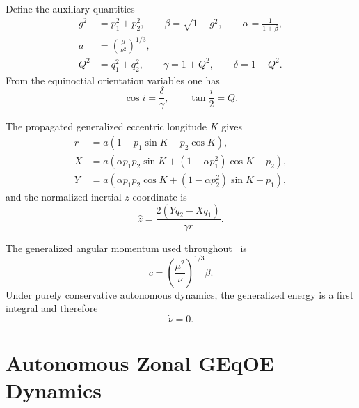 \documentclass[11pt]{article}
\begin{document}
Define the auxiliary quantities
\begin{align}
g^2 &= p_1^2 + p_2^2, \qquad \beta = \sqrt{1-g^2}, \qquad
\alpha = \frac{1}{1+\beta}, \label{eq:prelim_beta}\\
a &= \left(\frac{\mu}{\nu^2}\right)^{1/3}, \\
Q^2 &= q_1^2 + q_2^2, \qquad
\gamma = 1 + Q^2, \qquad
\delta = 1 - Q^2.
\end{align}
From the equinoctial orientation variables one has
\begin{equation}
\cos i = \frac{\delta}{\gamma},
\qquad
\tan\frac{i}{2} = Q.
\end{equation}

The propagated generalized eccentric longitude $K$ gives
\begin{align}
r &= a\left(1 - p_1 \sin K - p_2 \cos K\right), \label{eq:rK}\\
X &= a\left(\alpha p_1 p_2 \sin K + (1-\alpha p_1^2)\cos K - p_2\right), \\
Y &= a\left(\alpha p_1 p_2 \cos K + (1-\alpha p_2^2)\sin K - p_1\right),
\end{align}
and the normalized inertial $z$ coordinate is
\begin{equation}
\hat z = \frac{2(Yq_2 - Xq_1)}{\gamma r}. \label{eq:zhat}
\end{equation}

The generalized angular momentum used throughout~\cite{bau2021} is
\begin{equation}
c = \left(\frac{\mu^2}{\nu}\right)^{1/3}\beta. \label{eq:cdef}
\end{equation}
Under purely conservative autonomous dynamics, the generalized energy is a first
integral and therefore
\begin{equation}
\dot{\nu} = 0.
\end{equation}

\section{Autonomous Zonal GEqOE Dynamics}
\end{document}
